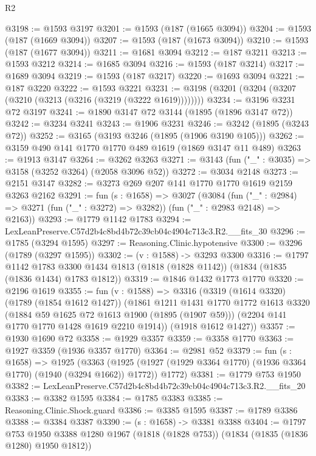 \begin{lexlean}{R2}
\begin{coremodule}
@3198 := @1593 @3197
@3201 := @1593 (@187 (@1665 @3094))
@3204 := @1593 (@187 (@1669 @3094))
@3207 := @1593 (@187 (@1673 @3094))
@3210 := @1593 (@187 (@1677 @3094))
@3211 := @1681 @3094
@3212 := @187 @3211
@3213 := @1593 @3212
@3214 := @1685 @3094
@3216 := @1593 (@187 @3214)
@3217 := @1689 @3094
@3219 := @1593 (@187 @3217)
@3220 := @1693 @3094
@3221 := @187 @3220
@3222 := @1593 @3221
@3231 := @3198 (@3201 (@3204 (@3207 (@3210 (@3213 (@3216 (@3219 (@3222 @1619))))))))
@3234 := @3196 @3231 @72 @3197
@3241 := @1890 @3147 @72 @3144 (@1895 (@1896 @3147 @72))
@3242 := @3234 @3241
@3243 := @1906 @3231
@3246 := @3242 (@1895 (@3243 @72))
@3252 := @3165 (@3193 @3246 (@1895 (@1906 @3190 @105)))
@3262 := @3159 @490 @141 @1770 @1770 @489 @1619 (@1869 @3147 @11 @489)
@3263 := @1913 @3147
@3264 := @3262 @3263
@3271 := @3143 (fun ("_" : @3035) => @3158 (@3252 @3264) (@2058 @3096 @52))
@3272 := @3034 @2148
@3273 := @2151 @3147
@3282 := @3273 @269 @207 @141 @1770 @1770 @1619 @2159 @3263 @2162
@3291 := fun (s : @1658) =>
  @3027
    (@3084
      (fun ("_" : @2984) => @3271 (fun ("_" : @3272) => @3282))
      (fun ("_" : @2983 @2148) => @2163))
@3293 := @1779 @1142 @1783
@3294 := LexLeanPreserve.C57d2b4c8bd4b72c39cb04c4904c713c3.R2.__fits_30
@3296 := @1785 (@3294 @1595)
@3297 := Reasoning.Clinic.hypotensive
@3300 := @3296 (@1789 (@3297 @1595))
@3302 := (v : @1588) -> @3293 @3300
@3316 := @1797
    @1142
    @1783
    @3300
    @1434
    @1813
    (@1818 (@1828 @1142))
    (@1834 (@1835 (@1836 @1434) @1783 @1812))
@3319 := @1846 @1432 @1773 @1770
@3320 := @2196 @1619
@3355 := fun (v : @1588) =>
  @3316
    (@3319
      (@1614 @3320)
      (@1789 (@1854 @1612 @1427))
      (@1861
        @1211
        @1431
        @1770
        @1772
        @1613
        @3320
        (@1884 @59 @1625 @72 @1613 @1900 (@1895 (@1907 @59)))
        (@2204 @141 @1770 @1770 @1428 @1619 @2210 @1914))
      (@1918 @1612 @1427))
@3357 := @1930 @1690 @72
@3358 := @1929 @3357
@3359 := @3358 @1770
@3363 := @1927 @3359 (@1936 @3357 @1770)
@3364 := @2981 @52
@3379 := fun (s : @1658) =>
  @1925
    (@3363
      (@1925 (@1927 (@1929 @3364 @1770) (@1936 @3364 @1770) (@1940 (@3294 @1662)) @1772))
      @1772)
@3381 := @1779 @753 @1950
@3382 := LexLeanPreserve.C57d2b4c8bd4b72c39cb04c4904c713c3.R2.__fits_20
@3383 := @3382 @1595
@3384 := @1785 @3383
@3385 := Reasoning.Clinic.Shock.guard
@3386 := @3385 @1595
@3387 := @1789 @3386
@3388 := @3384 @3387
@3390 := (s : @1658) -> @3381 @3388
@3404 := @1797
    @753
    @1950
    @3388
    @1280
    @1967
    (@1818 (@1828 @753))
    (@1834 (@1835 (@1836 @1280) @1950 @1812))

\end{coremodule}
\end{lexlean}
